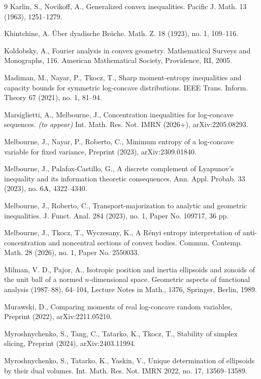 \documentclass[10pt]{amsart}
\newcommand{\1}{\textbf{1}}
\newcommand{\red}{}
\theoremstyle{remark}
\theoremstyle{definition}
\begin{document}
\begin{thebibliography}{9}
Karlin, S., Novikoff, A.,
Generalized convex inequalities.
Pacific J. Math. 13 (1963), 1251--1279.


Khintchine, A. \"Uber dyadische Br\"uche. 
Math. Z. 18 (1923), no. 1, 109--116.


Koldobsky, A., Fourier analysis in convex geometry. Mathematical Surveys and Monographs, 116. American Mathematical Society, Providence, RI, 2005.

{\red 
{}
Madiman, M., Nayar, P., Tkocz, T., Sharp moment-entropy inequalities and capacity bounds for symmetric log-concave distributions. IEEE Trans. Inform. Theory 67 (2021), no. 1, 81--94. 
}

{\red
{}
Marsiglietti, A., Melbourne, J., Concentration inequalities for log-concave sequences.
{\it (to appear)} Int. Math. Res. Not. IMRN (2026+), arXiv:2205.08293.
}

{\red
{}
Melbourne, J., Nayar, P., Roberto, C., 
Minimum entropy of a log-concave variable for fixed variance,
Preprint (2023), arXiv:2309.01840.}


Melbourne, J., Palafox-Castillo, G., A discrete complement of Lyapunov’s inequality and its information theoretic consequences.  Ann. Appl. Probab. 33 (2023), no. 6A, 4322--4340.


Melbourne, J., Roberto, C., Transport-majorization to analytic and geometric inequalities.  J. Funct. Anal. 284 (2023), no. 1, Paper No. 109717, 36 pp.


Melbourne, J., Tkocz, T., Wyczesany, K.,
A Rényi entropy interpretation of anti-concentration and noncentral sections of convex bodies. Commun. Contemp. Math. 28 (2026), no. 1, Paper No. 2550033.



Milman, V. D., Pajor, A., Isotropic position and inertia ellipsoids and zonoids of the unit ball of a normed $n$-dimensional space. Geometric aspects of functional analysis (1987--88), 64--104, Lecture Notes in Math., 1376, Springer, Berlin, 1989.


Murawski, D.,
Comparing moments of real log-concave random variables,
Preprint (2022), arXiv:2211.05210.


Myroshnychenko, S., Tang, C., Tatarko, K., Tkocz, T.,
Stability of simplex slicing,
Preprint (2024), arXiv:2403.11994.


Myroshnychenko, S., Tatarko, K., Yaskin, V., Unique determination of ellipsoids by their dual volumes. 
Int. Math. Res. Not. IMRN 2022, no. 17, 13569--13589.



\end{thebibliography}
\end{document}

